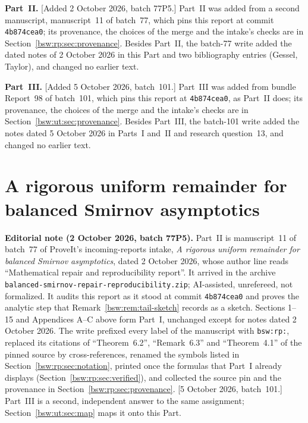\documentclass[11pt,letterpaper]{article}
\makeatletter
\theoremstyle{definition}
\theoremstyle{remark}
\newcommand{\bswwidetoc}{%
  \renewcommand*\l@section[2]{%
    \ifnum \c@tocdepth >\z@
      \addpenalty\@secpenalty
      \addvspace{1.0em \@plus\p@}%
      \setlength\@tempdima{2.6em}%
      \begingroup
        \parindent \z@ \rightskip \@pnumwidth
        \parfillskip -\@pnumwidth
        \leavevmode \bfseries
        \advance\leftskip\@tempdima
        \hskip -\leftskip
        ##1\nobreak\hfil
        \nobreak\hb@xt@\@pnumwidth{\hss ##2%
                                   \kern-\p@\kern\p@}\par
      \endgroup
    \fi}}
\makeatother
\begin{document}
\textbf{Part~II.}  [Added 2 October 2026, batch 77P5.]  Part~II was added
from a second manuscript, manuscript~11 of batch~77, which pins this report
at commit \texttt{4b874cea0}; its provenance, the choices of the merge and
the intake's checks are in Section~\ref{bsw:rp:sec:provenance}.  Besides
Part~II, the batch-77 write added the dated notes of 2 October 2026 in
this Part and two bibliography entries (Gessel, Taylor), and changed no
earlier text.

\textbf{Part~III.}  [Added 5 October 2026, batch~101.]  Part~III was added
from bundle Report~98 of batch~101, which pins this report at
\texttt{4b874cea0}, as Part~II does; its provenance, the choices of the
merge and the intake's checks are in Section~\ref{bsw:ut:sec:provenance}.
Besides Part~III, the batch-101 write added the notes dated 5 October 2026
in Parts~I and~II and research question~13, and changed no earlier
text.

\clearpage
\setcounter{part}{1}
\part{A rigorous uniform remainder for balanced Smirnov asymptotics}
\label{bsw:rp:part}
\addtocontents{toc}{\protect\bswwidetoc}
\setcounter{section}{0}
\renewcommand{\thesection}{II.\arabic{section}}
\renewcommand{\theHsection}{rp.\arabic{section}}

{\small\textbf{Editorial note (2 October 2026, batch 77P5).}
Part~II is manuscript~11 of batch~77 of ProveIt's incoming-reports intake,
\emph{A rigorous uniform remainder for balanced Smirnov asymptotics}, dated
2 October 2026, whose author line reads ``Mathematical repair and
reproducibility report''.  It arrived in the archive
\texttt{balanced-smirnov-repair-reproducibility.zip}; AI-assisted,
unrefereed, not formalized.  It audits this report as it stood at commit
\texttt{4b874cea0} and proves the analytic step that
Remark~\ref{bsw:rem:tail-sketch} records as a sketch.  Sections 1--15 and
Appendices A--C above form Part~I, unchanged except for notes dated
2 October 2026.  The write prefixed every label of the manuscript with
\texttt{bsw:rp:}, replaced its citations of ``Theorem~6.2'', ``Remark~6.3''
and ``Theorem~4.1'' of the pinned source by cross-references, renamed the
symbols listed in Section~\ref{bsw:rp:sec:notation}, printed once the
formulas that Part~I already displays (Section~\ref{bsw:rp:sec:verified}),
and collected the source pin and the provenance in
Section~\ref{bsw:rp:sec:provenance}.
[5 October 2026, batch~101.]  Part~III is a second, independent answer to
the same assignment; Section~\ref{bsw:ut:sec:map} maps it onto this
Part.\par}
\end{document}
